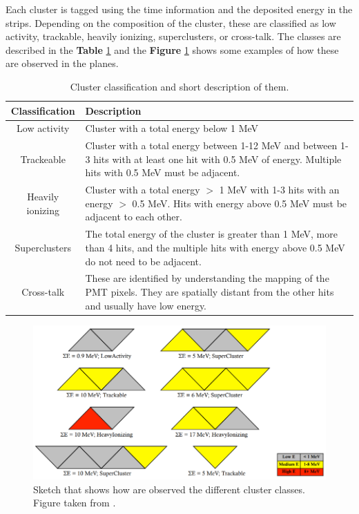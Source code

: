 Each cluster is tagged using the time information and the deposited energy in the strips. Depending on the composition of the cluster, these are classified as low activity, trackable, heavily ionizing, superclusters, or cross-talk. The classes are described in the \textbf{Table} \ref{tab:MnvExp:MnvDetector:DataReconstruction:Clustering:ClusterClasses} and the \textbf{Figure} \ref{fig:MnvExp:MnvDetector:DataReconstruction:Clustering:ClusterSketch} shows some examples of how these are observed in the planes.

\begin{table}[!htb]
    \centering
    \begin{tabular}{c|p{3.5in}}
        Classification & Description \\ \hline
        Low activity & Cluster with a total energy below 1 MeV\\ \hline
        Trackeable & Cluster with a total energy between 1-12 MeV and between 1-3 hits with at least one hit with 0.5 MeV of energy. Multiple hits with 0.5 MeV must be adjacent.\\ \hline
        Heavily ionizing & Cluster with a total energy $>$ 1 MeV with 1-3 hits with an energy $>$ 0.5 MeV. Hits with energy above 0.5 MeV must be adjacent to each other. \\ \hline
        Superclusters & The total energy of the cluster is greater than 1 MeV, more than 4 hits, and the multiple hits with energy above 0.5 MeV do not need to be adjacent. \\ \hline
        Cross-talk & These are identified by understanding the mapping of the PMT pixels. They are spatially distant from the other hits and usually have low energy.\\ \hline
    \end{tabular}
    \caption{Cluster classification and short description of them.}
    \label{tab:MnvExp:MnvDetector:DataReconstruction:Clustering:ClusterClasses}
\end{table}



\begin{figure} [!htb]
    \centering
    \includegraphics[scale=0.5]{Figures/Chapter2/ClusterScketch.png}
    \caption{Sketch that shows how are observed the different cluster classes. Figure taken from \cite{PerduePresentation}.}
    \label{fig:MnvExp:MnvDetector:DataReconstruction:Clustering:ClusterSketch}
\end{figure}

